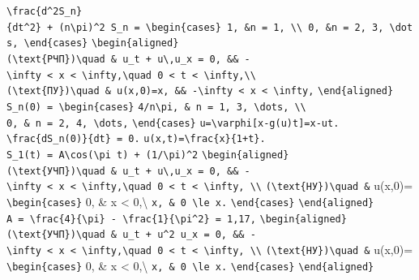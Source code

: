 \documentclass[
  ukrainian,
]{article}
\begin{document}
\texttt{\textbackslash{}frac\{d\^{}2S\_n\}\{dt\^{}2\}\ +\ (n\textbackslash{}pi)\^{}2\ S\_n\ =\ \textbackslash{}begin\{cases\}\ 1,\ \&n\ =\ 1,\ \textbackslash{}\textbackslash{}\ 0,\ \&n\ =\ 2,\ 3,\ \textbackslash{}dots,\ \textbackslash{}end\{cases\}}
\texttt{\textbackslash{}begin\{aligned\}}
\texttt{(\textbackslash{}text\{РЧП\})\textbackslash{}quad\ \&\ u\_t\ +\ u\textbackslash{},u\_x\ =\ 0,\ \&\&\ -\textbackslash{}infty\ \textless{}\ x\ \textless{}\ \textbackslash{}infty,\textbackslash{}quad\ 0\ \textless{}\ t\ \textless{}\ \textbackslash{}infty,\textbackslash{}\textbackslash{}}
\texttt{(\textbackslash{}text\{ПУ\})\textbackslash{}quad\ \&\ u(x,0)=x,\ \&\&\ -\textbackslash{}infty\ \textless{}\ x\ \textless{}\ \textbackslash{}infty,}
\texttt{\textbackslash{}end\{aligned\}}
\texttt{S\_n(0)\ =\ \textbackslash{}begin\{cases\}}
\texttt{4/n\textbackslash{}pi,\ \&\ n\ =\ 1,\ 3,\ \textbackslash{}dots,\ \textbackslash{}\textbackslash{}}
\texttt{0,\ \&\ n\ =\ 2,\ 4,\ \textbackslash{}dots,}
\texttt{\textbackslash{}end\{cases\}}
\texttt{u=\textbackslash{}varphi{[}x-g(u)t{]}=x-ut.}
\texttt{\textbackslash{}frac\{dS\_n(0)\}\{dt\}\ =\ 0.}
\texttt{u(x,t)=\textbackslash{}frac\{x\}\{1+t\}.}
\texttt{S\_1(t)\ =\ A\textbackslash{}cos(\textbackslash{}pi\ t)\ +\ (1/\textbackslash{}pi)\^{}2}
\texttt{\textbackslash{}begin\{aligned\}}
\texttt{(\textbackslash{}text\{УЧП\})\textbackslash{}quad\ \&\ u\_t\ +\ u\textbackslash{},u\_x\ =\ 0,\ \&\&\ -\textbackslash{}infty\ \textless{}\ x\ \textless{}\ \textbackslash{}infty,\textbackslash{}quad\ 0\ \textless{}\ t\ \textless{}\ \textbackslash{}infty,\ \textbackslash{}\textbackslash{}}
\texttt{(\textbackslash{}text\{НУ\})\textbackslash{}quad\ \&} u(x,0)=
\texttt{\textbackslash{}begin\{cases\}} 0, \& x \textless{}
0,\textbackslash{} \texttt{x,\ \&\ 0\ \textbackslash{}le\ x.}
\texttt{\textbackslash{}end\{cases\}}
\texttt{\textbackslash{}end\{aligned\}}
\texttt{A\ =\ \textbackslash{}frac\{4\}\{\textbackslash{}pi\}\ -\ \textbackslash{}frac\{1\}\{\textbackslash{}pi\^{}2\}\ =\ 1,17,}
\texttt{\textbackslash{}begin\{aligned\}}
\texttt{(\textbackslash{}text\{УЧП\})\textbackslash{}quad\ \&\ u\_t\ +\ u\^{}2\ u\_x\ =\ 0,\ \&\&\ -\textbackslash{}infty\ \textless{}\ x\ \textless{}\ \textbackslash{}infty,\textbackslash{}quad\ 0\ \textless{}\ t\ \textless{}\ \textbackslash{}infty,\ \textbackslash{}\textbackslash{}}
\texttt{(\textbackslash{}text\{НУ\})\textbackslash{}quad\ \&} u(x,0)=
\texttt{\textbackslash{}begin\{cases\}} 0, \& x \textless{}
0,\textbackslash{} \texttt{x,\ \&\ 0\ \textbackslash{}le\ x.}
\texttt{\textbackslash{}end\{cases\}}
\texttt{\textbackslash{}end\{aligned\}}
\end{document}
